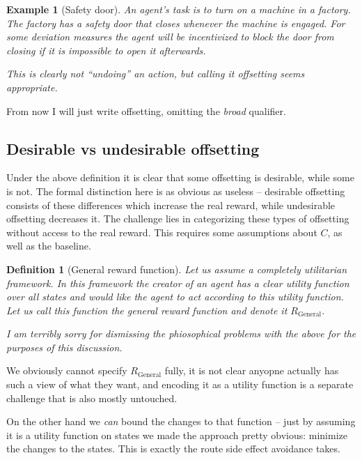 \documentclass{article}
\newtheorem{definition}{Definition}
\newcommand{\rewardFunction}{R}
\newcommand{\generalRewardFunction}{\rewardFunction_{\mathrm{General}}}
\newcommand{\corruption}{C}
\newtheorem{example}{Example}
\begin{document}
	\begin{example}[Safety door]
		An agent's task is to turn on a machine in a factory. The factory has a safety door that
		closes whenever the machine is engaged. For some deviation measures the agent will be
		incentivized to block the door from closing if it is impossible to open it afterwards.

		This is clearly not ``undoing'' an action, but calling it offsetting seems appropriate.
	\label{eg:factory}
	\end{example}

	From now I will just write offsetting, omitting the \emph{broad} qualifier.

	\subsection{Desirable vs undesirable offsetting}
		Under the above definition it is clear that some offsetting is desirable, while some is not.
		The formal distinction here is as obvious as useless -- desirable offsetting consists of these
		differences which increase the real reward, while undesirable
		offsetting decreases it. The challenge lies in categorizing these types of offsetting
		without access to the real reward. This requires some assumptions about $\corruption$, as
		well as the baseline.

		\begin{definition}[General reward function]
			Let us assume a completely utilitarian framework. In this framework the creator
			of an agent has a clear utility function over all states and would like the
			agent to act according to this utility function. Let us call this function the
			\emph{general reward function} and denote it $\generalRewardFunction$.

			I am terribly sorry for dismissing the phiosophical problems with the above
			for the purposes of this discussion.
			\label{def:morality}
		\end{definition}

		We obviously cannot specify $\generalRewardFunction$ fully, it is not clear anyopne
		actually has such a view of what they want, and encoding it as a utility function is
		a separate challenge that	is also mostly untouched. 

		On the other hand we \emph{can} bound the changes to that function -- just by assuming
		it is a utility function on states we made the approach pretty obvious: minimize the
		changes to the states. This is exactly the route side effect avoidance takes.
\end{document}
